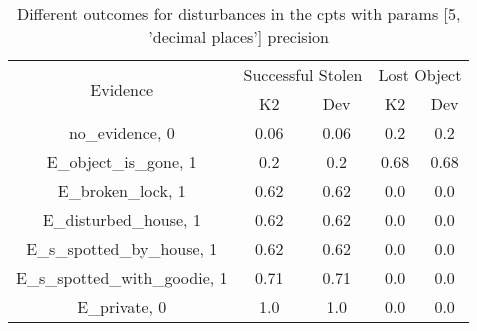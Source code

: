 \begin{table}\begin{tabular}{c|cc|cc}\toprule\multirow{2}{*}{Evidence} & \multicolumn{2}{c}{Successful Stolen} & \multicolumn{2}{c}{Lost Object} \\& {K2} & {Dev} & {K2} & {Dev} \\\midrule
no\_evidence, 0 & 0.06&0.06&0.2&0.2\\E\_object\_is\_gone, 1 & 0.2&0.2&0.68&0.68\\E\_broken\_lock, 1 & 0.62&0.62&0.0&0.0\\E\_disturbed\_house, 1 & 0.62&0.62&0.0&0.0\\E\_s\_spotted\_by\_house, 1 & 0.62&0.62&0.0&0.0\\E\_s\_spotted\_with\_goodie, 1 & 0.71&0.71&0.0&0.0\\E\_private, 0 & 1.0&1.0&0.0&0.0\\\bottomrule\end{tabular}\caption{Different outcomes for disturbances in the cpts with params [5, 'decimal places'] precision}\end{table}